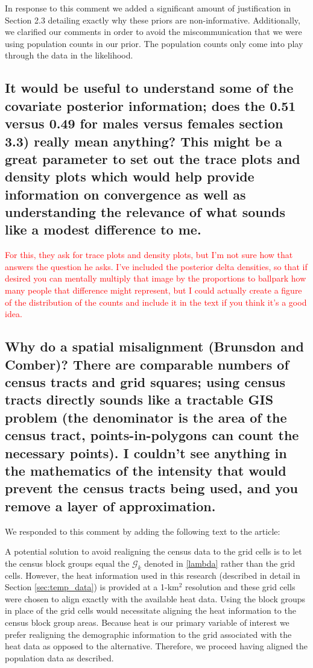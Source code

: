 \documentclass{article}
\begin{document}
In response to this comment we added a significant amount of justification in Section 2.3 detailing exactly why these priors are non-informative. Additionally, we clarified our comments in order to avoid the miscommunication that we were using population counts in our prior. The population counts only come into play through the data in the likelihood.

\subsection{It would be useful to understand some of the covariate posterior information; does the 0.51 versus 0.49 for males versus females section 3.3) really mean anything?   This might be a great parameter to set out the trace plots and density plots which would help provide information on convergence as well as understanding the relevance of what sounds like a modest difference to me.}

\textcolor{red}{For this, they ask for trace plots and density plots, but I'm not sure how that answers the question he asks. I've included the posterior delta densities, so that if desired you can mentally multiply that image by the proportions to ballpark how many people that difference might represent, but I could actually create a figure of the distribution of the counts and include it in the text if you think it's a good idea.}

\subsection{Why do a spatial misalignment (Brunsdon and Comber)?   There are comparable numbers of census tracts and grid squares; using census tracts directly sounds like a tractable GIS problem (the denominator is the area of the census tract, points-in-polygons can count the necessary points).   I couldn't see anything in the mathematics of the intensity that would prevent the census tracts being used, and you remove a layer of approximation.}

We responded to this comment by adding the following text to the article:

\begin{displayquote}
A potential solution to avoid realigning the census data to the grid cells is to let the census block groups equal the $\mathcal{G}_k$ denoted in \eqref{lambda} rather than the grid cells. However, the heat information used in this research (described in detail in Section \ref{sec:temp_data}) is provided at a 1-km$^2$ resolution and these grid cells were chosen to align exactly with the available heat data. Using the block groups in place of the grid cells would necessitate aligning the heat information to the census block group areas. Because heat is our primary variable of interest we prefer realigning the demographic information to the grid associated with the heat data as opposed to the alternative. Therefore, we proceed having aligned the population data as described.
\end{displayquote}
\end{document}
